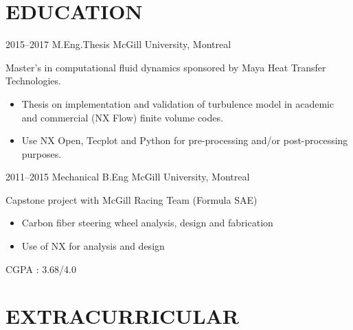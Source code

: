 \section{EDUCATION}
%
\begin{entrylist}
\entry
{2015--2017}
{M.Eng.Thesis %
}
{McGill University, Montreal}
{%
Master's in computational fluid dynamics sponsored by Maya Heat Transfer Technologies.
\begin{itemize}
\item Thesis on implementation and validation of turbulence model in academic and commercial (NX Flow) finite volume codes.
\item Use NX Open, Tecplot and Python for pre-processing and/or post-processing purposes.
\end{itemize}
}
%
\entry
{2011--2015}
{Mechanical B.Eng %
}
{McGill University, Montreal}
{%
Capstone project with McGill Racing Team (Formula SAE)
\begin{itemize}
\item Carbon fiber steering wheel analysis, design and fabrication
\item Use of NX for analysis and design
\end{itemize}
CGPA : 3.68/4.0
}
\end{entrylist}

\section{EXTRACURRICULAR}


